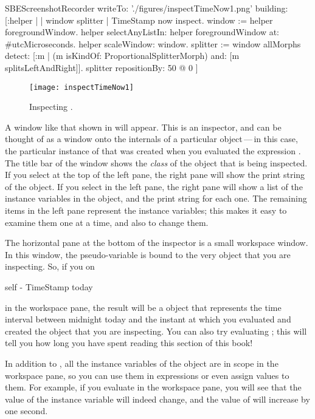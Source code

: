 \documentclass[a4paper,10pt,twoside]{book}
\begin{document}
\begin{ExecuteSmalltalkScript}
SBEScreenshotRecorder writeTo: './figures/inspectTimeNow1.png' building: [:helper | | window splitter |
	TimeStamp now inspect.
	window := helper foregroundWindow.
	helper selectAnyListIn: helper foregroundWindow at: #utcMicroseconds.
	helper scaleWindow: window.
	splitter := window allMorphs detect: [:m |
		(m isKindOf: ProportionalSplitterMorph) and: [m splitsLeftAndRight]].
	splitter repositionBy: 50 @ 0
]
\end{ExecuteSmalltalkScript}
\begin{figure}[btp]
	\begin{center}
		\texttt{[image: inspectTimeNow1]}
	\end{center}
	\caption{Inspecting .}
	\label{fig:inspectTimeNow1}
\end{figure}

A window like that shown in  will appear.
This is an inspector, and can be thought of as a window onto the internals of a particular object\,---\,in this case, the particular instance of  that was created when you evaluated the expression .
The title bar of the window shows the \emph{class} of the object that is being inspected.
If you select  at the top of the left pane, the right pane will show the print string of the object.
If you select  in the left pane, the right pane will show a list of the instance variables in the object, and the print string for each one.
The remaining items in the left pane represent the instance variables; this makes it easy to examine them one at a time, and also to change them.

The horizontal pane at the bottom of the inspector is a small workspace window.
In this window, the pseudo-variable  is bound to the very object that you are inspecting.
So, if you  on
\begin{code}{}
self - TimeStamp today
\end{code}
in the workspace pane, the result will be a  object that represents the time interval between midnight today and the instant at which you evaluated  and created the  object that you are inspecting.
You can also try evaluating ; this will tell you how long you have spent reading this section of this book!

In addition to , all the instance variables of the object are in scope in the workspace pane, so you can use them in expressions or even assign values to them.
For example, if you evaluate  in the workspace pane, you will see that the value of the  instance variable will indeed change, and the value of  will increase by one second.
\end{document}
